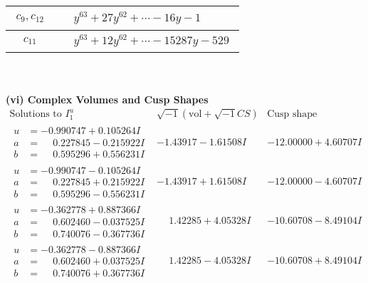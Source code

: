 \documentclass[1p]{elsarticle_modified}
\theoremstyle{definition}
\newcommand{\I}{\sqrt{-1}}
\begin{document}
\begin{tabular}{m{50pt}|m{274pt}}
\hline $$\begin{aligned}c_{9},c_{12}\end{aligned}$$&$\begin{aligned}
&y^{63}+27 y^{62}+\cdots-16 y-1
\end{aligned}$\\
\hline $$\begin{aligned}c_{11}\end{aligned}$$&$\begin{aligned}
&y^{63}+12 y^{62}+\cdots-15287 y-529
\end{aligned}$\\
\hline
\end{tabular}\\~\\
\newpage\flushleft \textbf{(vi) Complex Volumes and Cusp Shapes}
$$\begin{array}{c|c|c}  
\text{Solutions to }I^u_{1}& \I (\text{vol} + \sqrt{-1}CS) & \text{Cusp shape}\\
 \hline 
\begin{aligned}
u &= -0.990747 + 0.105264 I \\
a &= \phantom{-}0.227845 - 0.215922 I \\
b &= \phantom{-}0.595296 + 0.556231 I\end{aligned}
 & -1.43917 - 1.61508 I & -12.00000 + 4.60707 I \\ \hline\begin{aligned}
u &= -0.990747 - 0.105264 I \\
a &= \phantom{-}0.227845 + 0.215922 I \\
b &= \phantom{-}0.595296 - 0.556231 I\end{aligned}
 & -1.43917 + 1.61508 I & -12.00000 - 4.60707 I \\ \hline\begin{aligned}
u &= -0.362778 + 0.887366 I \\
a &= \phantom{-}0.602460 - 0.037525 I \\
b &= \phantom{-}0.740076 - 0.367736 I\end{aligned}
 & \phantom{-}1.42285 + 4.05328 I & -10.60708 - 8.49104 I \\ \hline\begin{aligned}
u &= -0.362778 - 0.887366 I \\
a &= \phantom{-}0.602460 + 0.037525 I \\
b &= \phantom{-}0.740076 + 0.367736 I\end{aligned}
 & \phantom{-}1.42285 - 4.05328 I & -10.60708 + 8.49104 I \\ \hline\begin{aligned}

\end{aligned}
\end{array}$$
\end{document}
